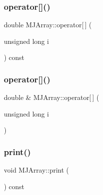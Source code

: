 \hypertarget{classMJArray_a813a61264d4a763702bec802199fec2c}{}\label{classMJArray_a813a61264d4a763702bec802199fec2c} 
\subsubsection{\texorpdfstring{operator[]()}{operator[]()}\hspace{0.1cm}{\footnotesize\ttfamily [1/2]}}
{\footnotesize\ttfamily double M\+J\+Array\+::operator\mbox{[}$\,$\mbox{]} (\begin{DoxyParamCaption}\item[{unsigned long}]{i }\end{DoxyParamCaption}) const\hspace{0.3cm}{\ttfamily [inline]}}

\hypertarget{classMJArray_a039a83653bc0ba6f8c0aa7c74deb3bd7}{}\label{classMJArray_a039a83653bc0ba6f8c0aa7c74deb3bd7} 
\subsubsection{\texorpdfstring{operator[]()}{operator[]()}\hspace{0.1cm}{\footnotesize\ttfamily [2/2]}}
{\footnotesize\ttfamily double \& M\+J\+Array\+::operator\mbox{[}$\,$\mbox{]} (\begin{DoxyParamCaption}\item[{unsigned long}]{i }\end{DoxyParamCaption})\hspace{0.3cm}{\ttfamily [inline]}}

\hypertarget{classMJArray_a0bcd1aaca8e71b17364ae9f00eaf88df}{}\label{classMJArray_a0bcd1aaca8e71b17364ae9f00eaf88df} 
\subsubsection{\texorpdfstring{print()}{print()}}
{\footnotesize\ttfamily void M\+J\+Array\+::print (\begin{DoxyParamCaption}{ }\end{DoxyParamCaption}) const}

\hypertarget{classMJArray_adbdbdf57961201fe20593a346f1e3c09}{}\label{classMJArray_adbdbdf57961201fe20593a346f1e3c09} 
